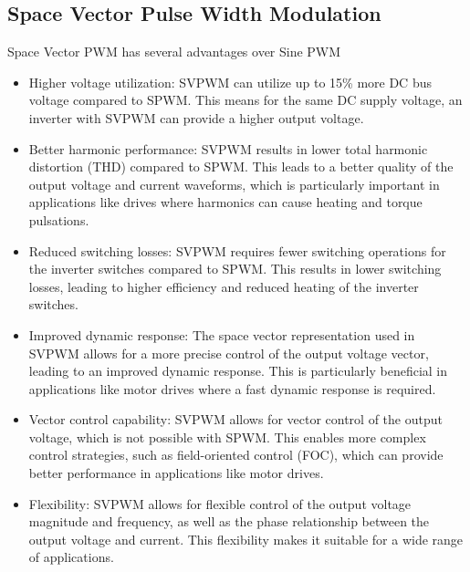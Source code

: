 \subsection{Space Vector Pulse Width Modulation}

Space Vector PWM has several advantages over Sine PWM

\begin{itemize}
    \item Higher voltage utilization: SVPWM can utilize up to 15\% more DC bus voltage compared to SPWM. This means for the same DC supply voltage, an inverter with SVPWM can provide a higher output voltage.

    \item Better harmonic performance: SVPWM results in lower total harmonic distortion (THD) compared to SPWM. This leads to a better quality of the output voltage and current waveforms, which is particularly important in applications like drives where harmonics can cause heating and torque pulsations.

    \item Reduced switching losses: SVPWM requires fewer switching operations for the inverter switches compared to SPWM. This results in lower switching losses, leading to higher efficiency and reduced heating of the inverter switches.

    \item Improved dynamic response: The space vector representation used in SVPWM allows for a more precise control of the output voltage vector, leading to an improved dynamic response. This is particularly beneficial in applications like motor drives where a fast dynamic response is required.

    \item Vector control capability: SVPWM allows for vector control of the output voltage, which is not possible with SPWM. This enables more complex control strategies, such as field-oriented control (FOC), which can provide better performance in applications like motor drives.

    \item Flexibility: SVPWM allows for flexible control of the output voltage magnitude and frequency, as well as the phase relationship between the output voltage and current. This flexibility makes it suitable for a wide range of applications. 
\end{itemize}

\newpage